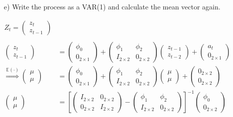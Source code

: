 \documentclass[12pt,a4paper]{article}
\begin{document}
\begin{itemize}
    \item[e)] Write the process as a VAR(1) and calculate the mean vector again.
\end{itemize}

\begin{align*}
  Z_t = \begin{pmatrix}  z_{t} \\ z_{t-1} \end{pmatrix}\\
  \\
  \begin{pmatrix} z_t  \\ z_{t-1} \end{pmatrix} & = \begin{pmatrix} \phi_0  \\ 0_{2 \times 1 }\end{pmatrix} + \begin{pmatrix} \phi_1 & \phi_2  \\ I_{2 \times 2}  & 0_{2 \times 2} \end{pmatrix} \begin{pmatrix} z_{t-1}  \\ z_{t-2} \end{pmatrix} + \begin{pmatrix} a_t  \\ 0_{2 \times 1} \end{pmatrix} \\
  \overset{\mathbb{E} (\cdot)}{\Rightarrow} \begin{pmatrix} \mu  \\ \mu \end{pmatrix} & =\begin{pmatrix} \phi_0  \\ 0_{2 \times 1} \end{pmatrix} + \begin{pmatrix} \phi_1 & \phi_2 \\ I_{2 \times 2} & 0_{2 \times 2} \end{pmatrix} \begin{pmatrix} \mu  \\ \mu \end{pmatrix} + \begin{pmatrix} 0_{2 \times 2} \\ 0_{2 \times 2} \end{pmatrix}\\
  \begin{pmatrix} \mu  \\ \mu \end{pmatrix} & = \left[  \begin{pmatrix} I_{2 \times 2} & 0_{2 \times 2}\\ 0_{2 \times 2} & I_{2 \times 2} \end{pmatrix} - \begin{pmatrix} \phi_1 & \phi_2 \\ I_{2 \times 2} & 0_{2 \times 2} \end{pmatrix} \right]^{-1} \begin{pmatrix} \phi_0 \\ 0_{2 \times 2} \end{pmatrix} \\

\end{align*}
\end{document}
